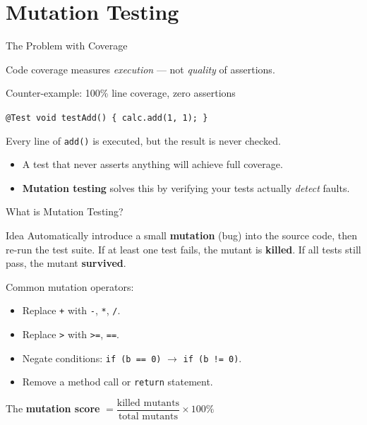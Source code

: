 \documentclass[11pt, xcolor=svgnames]{beamer}
\providecommand{\alert}[1]{\textbf{#1}}
\begin{document}
\section{Mutation Testing}


\begin{frame}{The Problem with Coverage}

Code coverage measures \emph{execution} --- not \emph{quality} of assertions.

\begin{exampleblock}{Counter-example: 100\% line coverage, zero assertions}
\begin{center}
\texttt{@Test void testAdd() \{ calc.add(1, 1); \}}
\end{center}
Every line of \texttt{add()} is executed, but the result is never checked.
\end{exampleblock}

\begin{itemize}
  \item A test that never asserts anything will achieve full coverage.
  \item \alert{Mutation testing} solves this by verifying your tests actually \emph{detect} faults.
\end{itemize}

\end{frame}


\begin{frame}{What is Mutation Testing?}

\begin{block}{Idea}
  Automatically introduce a small \alert{mutation} (bug) into the source code, then re-run the test suite. If at least one test fails, the mutant is \alert{killed}. If all tests still pass, the mutant \alert{survived}.
\end{block}

\vspace{0.5em}
Common mutation operators:

\begin{itemize}
  \item Replace \texttt{+} with \texttt{-}, \texttt{*}, \texttt{/}.
  \item Replace \texttt{>} with \texttt{>=}, \texttt{==}.
  \item Negate conditions: \texttt{if (b == 0)} $\rightarrow$ \texttt{if (b != 0)}.
  \item Remove a method call or \texttt{return} statement.
\end{itemize}

\vspace{0.5em}
The \alert{mutation score} $= \dfrac{\text{killed mutants}}{\text{total mutants}} \times 100\%$

\end{frame}
\end{document}
